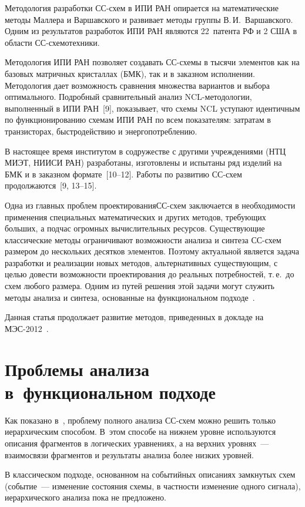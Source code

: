 \begin{multicols}{2}
  Методология разработки СС-схем в ИПИ РАН опирается на математические
методы Маллера и Варшавского и развивает методы группы
В.\,И.~Варшавского. Одним из результатов разработок ИПИ РАН являются
22~патента РФ и 2 США в области СС-схемотехники.

  Методология ИПИ РАН позволяет создавать СС-схе\-мы в тысячи элементов
как на базовых мат\-рич\-ных кристаллах (БМК), так и в заказном исполнении.
Методология дает возможность сравнения множества вариантов и выбора
оптимального. Подробный сравнительный анализ NCL-ме\-то\-до\-ло\-гии,
выполненный в ИПИ РАН~[9], показывает, что схемы NCL уступают
идентичным по функционированию схемам ИПИ РАН по всем показателям:
затратам в транзисторах, быстродействию и энергопотреблению.

  В настоящее время институтом в содружестве с другими учреждениями (НТЦ
МИЭТ, \mbox{НИИСИ} РАН) разработаны, изготовлены и испытаны ряд
изделий на БМК и в заказном формате~[10--12]. Работы по
развитию СС-схем продолжаются~[9, 13--15].

  Одна из главных проблем проектирования\linebreak СС-схем заключается
в необходимости применения специальных математических и других методов,
требующих больших, а подчас огромных вычислитель\-ных ресурсов.
Существующие классические методы ограничивают возможности анализа и
синтеза СС-схем размером до нескольких десятков элементов.
%
  Поэтому актуальной является задача разработки и реализации новых методов,
альтернативных существующим, с целью довести возможности проектирования
до реальных потребностей, т.\,е.\ до схем любого размера. Одним из путей
решения этой задачи могут служить методы анализа и синтеза, основанные на
функциональном подходе~\cite{5-p, 14-p}.

  Данная статья продолжает развитие методов, приведенных в докладе на
  МЭС-2012~\cite{16-p}.

\section{Проблемы анализа в~функциональном подходе}

  Как показано в~\cite{5-p, 16-p}, проблему полного анализа СС-схем можно
решить только иерархическим способом. В~этом способе на нижнем уровне
используются описания фрагментов в логических уравнениях, а на верхних
уровнях~--- взаимосвязи фрагментов и результаты анализа более низких
уровней.

  В классическом подходе, основанном на событийных описаниях замкнутых
схем (событие~--- изменение состояния схемы, в частности изменение одного
сигнала), иерархического анализа пока не предложено.


\end{multicols}
